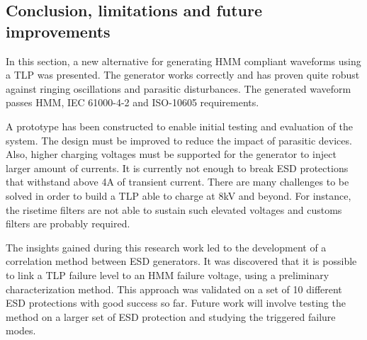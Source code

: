 \subsection{Conclusion, limitations and future improvements}

In this section, a new alternative for generating HMM compliant waveforms using a TLP was presented.
The generator works correctly and has proven quite robust against ringing oscillations and parasitic disturbances.
The generated waveform passes HMM, IEC 61000-4-2 and ISO-10605 requirements.

A prototype has been constructed to enable initial testing and evaluation of the system.
The design must be improved to reduce the impact of parasitic devices.
Also, higher charging voltages must be supported for the generator to inject larger amount of currents.
It is currently not enough to break ESD protections that withstand above 4A of transient current.
There are many challenges to be solved in order to build a TLP able to charge at 8kV and beyond.
For instance, the risetime filters are not able to sustain such elevated voltages and customs filters are probably required.

The insights gained during this research work led to the development of a correlation method between ESD generators.
It was discovered that it is possible to link a TLP failure level to an HMM failure voltage, using a preliminary characterization method.
This approach was validated on a set of 10 different ESD protections with good success so far.
Future work will involve testing the method on a larger set of ESD protection and studying the triggered failure modes.
